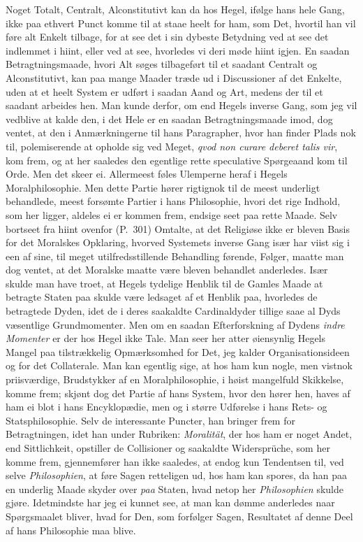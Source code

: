 \documentclass[12pt,a4paper]{book}
\newcommand{\apage}[1]{\marginnote{\footnotesize\textit{[#1]}}}
\begin{document}
Noget Totalt, Centralt, Alconstitutivt kan da hos Hegel, ifølge hans
hele Gang, ikke paa ethvert Punct komme til at staae heelt for ham,
som Det, hvortil han vil føre alt Enkelt tilbage, for at see det i sin
dybeste Betydning ved at see det indlemmet i hiint, eller ved at see,
hvorledes vi deri møde hiint igjen. En saadan Betragtningsmaade, hvori
Alt søges tilbageført til et saadant Centralt og Alconstitutivt, kan
paa mange Maader træde ud i Discussioner af det Enkelte, uden at et
heelt System er udført i saadan Aand og Art, medens der til et saadant
arbeides hen. Man kunde derfor, om end Hegels inverse Gang, som jeg vil
vedblive at kalde den, i det Hele er en saadan Betragtningsmaade imod,
dog ventet, at den i Anmærkningerne til hans Paragrapher, hvor han
finder Plads nok til, polemiserende at opholde sig ved Meget,
\textit{qvod non curare deberet talis vir}, kom frem, og at her
saaledes den egentlige rette speculative Spørgeaand kom til Orde. Men
det skeer ei. Allermeest føles Ulemperne heraf i Hegels
Moralphilosophie. Men dette Partie hører rigtignok til \apage{41} de meest
underligt behandlede, meest forsømte Partier i hans Philosophie, hvori
det rige Indhold, som her ligger, aldeles ei er kommen frem, endsige
seet paa rette Maade. Selv bortseet fra hiint ovenfor (P.\ 301)
Omtalte, at det Religiøse ikke er bleven Basis for det Moralskes
Opklaring, hvorved Systemets inverse Gang især har viist sig i een af
sine, til meget utilfredsstillende Behandling førende, Følger, maatte
man dog ventet, at det Moralske maatte være bleven behandlet
anderledes. Især skulde man have troet, at Hegels tydelige Henblik til
de Gamles Maade at betragte Staten paa skulde være ledsaget af et
Henblik paa, hvorledes de betragtede Dyden, idet de i deres saakaldte
Cardinaldyder tillige saae al Dyds væsentlige Grundmomenter. Men om en
saadan Efterforskning af Dydens \emph{indre Momenter} er der hos Hegel ikke
Tale. Man seer her atter øiensynlig Hegels Mangel paa tilstrækkelig
Opmærksomhed for Det, jeg kalder Organisationsideen og for det
Collaterale. Man kan egentlig sige, at hos ham kun nogle, men vistnok
priisværdige, Brudstykker af en Moralphilosophie, i høist mangelfuld
Skikkelse, komme frem; skjønt dog det Partie af hans System, hvor den
hører hen, haves af ham ei blot i hans Encyklopædie, men og i større
Udførelse i hans Rets- og Statsphilosophie. Selv de interessante
Puncter, han bringer frem for Betragtningen, idet han under Rubriken:
\emph{Moralität}, der hos ham er noget Andet, end Sittlichkeit, opstiller de
Collisioner og saakaldte Widersprüche, som her komme frem, gjennemfører
han ikke saaledes, at endog kun Tendentsen til, ved selve \emph{Philosophien},
at føre Sagen retteligen ud, hos ham kan spores, da han paa en underlig
Maade skyder over \emph{paa} Staten, hvad netop her \emph{Philosophien} skulde gjøre.
Idetmindste har jeg ei kunnet see, at man kan dømme anderledes naar
Spørgsmaalet bliver, hvad for Den, som forfølger Sagen, Resultatet af
denne Deel af hans Philosophie maa blive.
\end{document}
